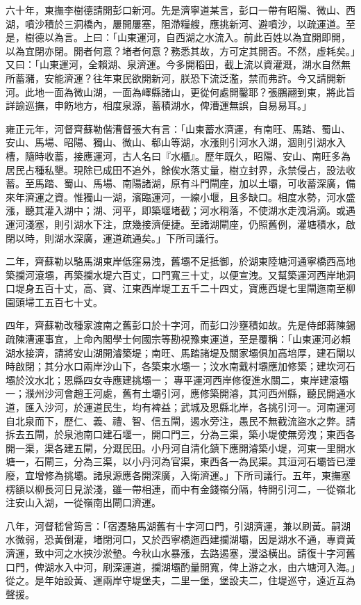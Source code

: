 \begin{pinyinscope}
六十年，東撫李樹德請開彭口新河。先是濟寧道某言，彭口一帶有昭陽、微山、西湖，噴沙積於三洞橋內，屢開屢塞，阻滯糧艘，應挑新河、避噴沙，以疏運道。至是，樹德以為言。上曰：「山東運河，自西湖之水流入。前此百姓以為宜開即開，以為宜閉亦閉。開者何意？堵者何意？務悉其故，方可定其開否。不然，虛耗矣。」又曰：「山東運河，全賴湖、泉濟運。今多開稻田，截上流以資灌溉，湖水自然無所蓄瀦，安能濟運？往年東民欲開新河，朕恐下流泛濫，禁而弗許。今又請開新河。此地一面為微山湖，一面為嶧縣諸山，更從何處開鑿耶？張鵬翮到東，將此旨詳諭巡撫，申飭地方，相度泉源，蓄積湖水，俾漕運無誤，自易易耳。」

雍正元年，河督齊蘇勒偕漕督張大有言：「山東蓄水濟運，有南旺、馬踏、蜀山、安山、馬場、昭陽、獨山、微山、郗山等湖，水漲則引河水入湖，涸則引湖水入槽，隨時收蓄，接應運河，古人名曰『水櫃』。歷年既久，昭陽、安山、南旺多為居民占種私墾。現除已成田不追外，餘俟水落丈量，樹立封界，永禁侵占，設法收蓄。至馬踏、蜀山、馬場、南陽諸湖，原有斗門閘座，加以土壩，可收蓄深廣，備來年濟運之資。惟獨山一湖，濱臨運河，一線小堰，且多缺口。相度水勢，河水盛漲，聽其灌入湖中；湖、河平，即築堰堵截；河水稍落，不使湖水走洩涓滴。或遇運河淺塞，則引湖水下注，庶幾接濟便捷。至諸湖閘座，仍照舊例，灌塘積水，啟閉以時，則湖水深廣，運道疏通矣。」下所司議行。

二年，齊蘇勒以駱馬湖東岸低窪易洩，舊壩不足抵御，於湖東陸塘河通寧橋西高地築攔河滾壩，再築攔水堤六百丈，口門寬三十丈，以便宣洩。又幫築運河西岸地洞口堤身五百十丈，高、寶、江東西岸堤工五千二十四丈，寶應西堤七里閘迤南至柳園頭埽工五百七十丈。

四年，齊蘇勒改種家渡南之舊彭口於十字河，而彭口沙壅積如故。先是侍郎蔣陳錫疏陳漕運事宜，上命內閣學士何國宗等勘視豫東運道，至是覆稱：「山東運河必賴湖水接濟，請將安山湖開濬築堤；南旺、馬踏諸堤及關家壩俱加高培厚，建石閘以時啟閉；其分水口兩岸沙山下，各築束水壩一；汶水南戴村壩應加修築；建坎河石壩於汶水北；恩縣四女寺應建挑壩一；專平運河西岸修復進水關二，東岸建滾壩一；濮州沙河會趙王河處，舊有土壩引河，應修築開濬，其河西州縣，聽民開通水道，匯入沙河，於運道民生，均有裨益；武城及恩縣北岸，各挑引河一。河南運河自北泉而下，歷仁、義、禮、智、信五閘，遏水旁注，愚民不無截流盜水之弊。請拆去五閘，於泉池南口建石堰一，開口門三，分為三渠，築小堤使無旁洩；東西各開一渠，渠各建五閘，分溉民田。小丹河自清化鎮下應開濬築小堤，河東一里開水塘一，石閘三，分為三渠，以小丹河為官渠，東西各一為民渠。其洹河石壩皆已湮廢，宜增修為挑壩。諸泉源應各開深廣，入衛濟運。」下所司議行。五年，東撫塞楞額以柳長河日見淤淺，雖一帶相連，而中有金錢嶺分隔，特開引河二，一從嶺北注安山入湖，一從嶺南出閘口濟運。

八年，河督嵇曾筠言：「宿遷駱馬湖舊有十字河口門，引湖濟運，兼以刷黃。嗣湖水微弱，恐黃倒灌，堵閉河口，又於西寧橋迤西建攔湖壩，因是湖水不通，專資黃濟運，致中河之水挾沙淤墊。今秋山水暴漲，去路遏塞，漫溢橫出。請復十字河舊口門，俾湖水入中河，刷深運道，攔湖壩酌量開寬，俾上游之水，由六塘河入海。」從之。是年始設黃、運兩岸守堤堡夫，二里一堡，堡設夫二，住堤巡守，遠近互為聲援。


\end{pinyinscope}
